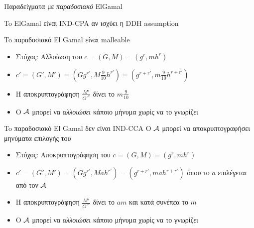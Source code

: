\documentclass{beamer}
\begin{document}
\begin{frame}[allowframebreaks]{Παραδείγματα με \textit{παραδοσιακό} ElGamal}

To ElGamal είναι IND-CPA αν ισχύει η DDH assumption

\begin{block}{To παραδοσιακό El Gamal είναι malleable}
\begin{itemize}
\item Στόχος: Αλλοίωση του $c = (G,M) = (g^r, m h^r)$
\item $c' = (G',M') = (G g^{r'}, M \frac{9}{10} h^{r'}) = (g^{r+r'}, m \frac{9}{10} h^{r+r'}) $
\item H αποκρυπτογράφηση $\frac{M'}{G'^x} $ δίνει το $m \frac{9}{10}$
\item Ο $\mathcal{A}$ μπορεί να \textit{αλλοιώσει} κάποιο μήνυμα χωρίς να το γνωρίζει
\end{itemize}
\end{block}

\begin{block}{To παραδοσιακό El Gamal δεν είναι IND-CCA}
Ο $\mathcal{A}$ μπορεί να αποκρυπτογραφήσει μηνύματα επιλογής του
\begin{itemize}
\item Στόχος: Αποκρυπτογράφηση του $c = (G,M) = (g^r, m h^r)$
\item $c' = (G',M') = (G g^{r'}, M a h^{r'}) = (g^{r+r'}, m a h^{r+r'}) $ όπου το $a$ επιλέγεται από τον $\mathcal{A}$
\item H αποκρυπτογράφηση $\frac{M'}{G'^x} $ δίνει το $am$ και κατά συνέπεα το $m$
\item Ο $\mathcal{A}$ μπορεί να \textit{αλλοιώσει} κάποιο μήνυμα χωρίς να το γνωρίζει
\end{itemize}
\end{block}

\end{frame}
\end{document}
